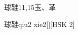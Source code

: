 \begin{entry}{球鞋}{11,15}{⽟、⾰}
  \begin{phonetics}{球鞋}{qiu2 xie2}[][HSK 2]
  \end{phonetics}
\end{entry}
